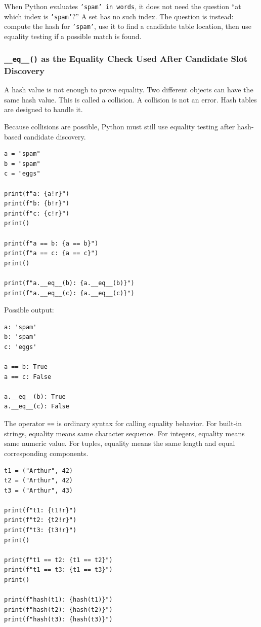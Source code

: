 When Python evaluates \texttt{'spam' in words}, it does not need the question ``at which index is \texttt{'spam'}?'' A set has no such index. The question is instead: compute the hash for \texttt{'spam'}, use it to find a candidate table location, then use equality testing if a possible match is found.

\subsubsection{\texttt{\_\_eq\_\_()} as the Equality Check Used After Candidate Slot Discovery}

A hash value is not enough to prove equality. Two different objects can have the same hash value. This is called a collision. A collision is not an error. Hash tables are designed to handle it.

Because collisions are possible, Python must still use equality testing after hash-based candidate discovery.

\begin{verbatim}
a = "spam"
b = "spam"
c = "eggs"

print(f"a: {a!r}")
print(f"b: {b!r}")
print(f"c: {c!r}")
print()

print(f"a == b: {a == b}")
print(f"a == c: {a == c}")
print()

print(f"a.__eq__(b): {a.__eq__(b)}")
print(f"a.__eq__(c): {a.__eq__(c)}")
\end{verbatim}

Possible output:

\begin{verbatim}
a: 'spam'
b: 'spam'
c: 'eggs'

a == b: True
a == c: False

a.__eq__(b): True
a.__eq__(c): False
\end{verbatim}

The operator \texttt{==} is ordinary syntax for calling equality behavior. For built-in strings, equality means same character sequence. For integers, equality means same numeric value. For tuples, equality means the same length and equal corresponding components.

\begin{verbatim}
t1 = ("Arthur", 42)
t2 = ("Arthur", 42)
t3 = ("Arthur", 43)

print(f"t1: {t1!r}")
print(f"t2: {t2!r}")
print(f"t3: {t3!r}")
print()

print(f"t1 == t2: {t1 == t2}")
print(f"t1 == t3: {t1 == t3}")
print()

print(f"hash(t1): {hash(t1)}")
print(f"hash(t2): {hash(t2)}")
print(f"hash(t3): {hash(t3)}")
\end{verbatim}

